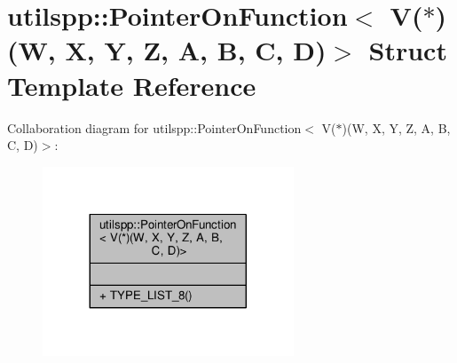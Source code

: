\hypertarget{structutilspp_1_1PointerOnFunction_3_01V_07_5_08_07W_00_01X_00_01Y_00_01Z_00_01A_00_01B_00_01C_00_01D_08_4}{\section{utilspp\-:\-:Pointer\-On\-Function$<$ V($\ast$)(W, X, Y, Z, A, B, C, D)$>$ Struct Template Reference}
\label{structutilspp_1_1PointerOnFunction_3_01V_07_5_08_07W_00_01X_00_01Y_00_01Z_00_01A_00_01B_00_01C_00_01D_08_4}
}


Collaboration diagram for utilspp\-:\-:Pointer\-On\-Function$<$ V($\ast$)(W, X, Y, Z, A, B, C, D)$>$\-:
\nopagebreak
\begin{figure}[H]
\begin{center}
\leavevmode
\includegraphics[width=212pt]{structutilspp_1_1PointerOnFunction_3_01V_07_5_08_07W_00_01X_00_01Y_00_01Z_00_01A_00_01B_00_01C_00_01D_08_4__coll__graph}
\end{center}
\end{figure}
